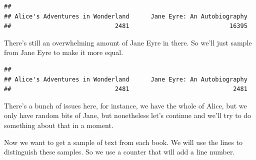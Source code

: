 \documentclass[
]{book}
\newenvironment{Shaded}{\begin{snugshade}}{\end{snugshade}}
\newcommand{\DataTypeTok}[1]{\textcolor[rgb]{0.13,0.29,0.53}{#1}}
\newcommand{\DecValTok}[1]{\textcolor[rgb]{0.00,0.00,0.81}{#1}}
\newcommand{\KeywordTok}[1]{\textcolor[rgb]{0.13,0.29,0.53}{\textbf{#1}}}
\newcommand{\NormalTok}[1]{#1}
\newcommand{\OperatorTok}[1]{\textcolor[rgb]{0.81,0.36,0.00}{\textbf{#1}}}
\newcommand{\OtherTok}[1]{\textcolor[rgb]{0.56,0.35,0.01}{#1}}
\newcommand{\StringTok}[1]{\textcolor[rgb]{0.31,0.60,0.02}{#1}}
\begin{document}
\begin{verbatim}
## 
## Alice's Adventures in Wonderland      Jane Eyre: An Autobiography 
##                             2481                            16395
\end{verbatim}

There's still an overwhelming amount of Jane Eyre in there. So we'll just sample from Jane Eyre to make it more equal.

\begin{Shaded}
\end{Shaded}

\begin{verbatim}
## 
## Alice's Adventures in Wonderland      Jane Eyre: An Autobiography 
##                             2481                             2481
\end{verbatim}

There's a bunch of issues here, for instance, we have the whole of Alice, but we only have random bits of Jane, but nonetheless let's continue and we'll try to do something about that in a moment.

Now we want to get a sample of text from each book. We will use the lines to distinguish these samples. So we use a counter that will add a line number.
\end{document}
